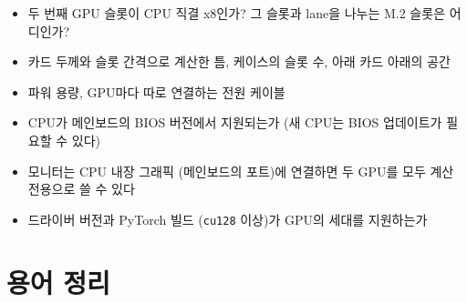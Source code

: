 \documentclass[11pt,a4paper]{article}
\begin{document}
\begin{thinkbox}[확인 목록]
\begin{itemize}[leftmargin=1.5em]
\item 두 번째 GPU 슬롯이 CPU 직결 x8인가? 그 슬롯과 lane을 나누는 M.2 슬롯은 어디인가?
\item 카드 두께와 슬롯 간격으로 계산한 틈, 케이스의 슬롯 수, 아래 카드 아래의 공간
\item 파워 용량, GPU마다 따로 연결하는 전원 케이블
\item CPU가 메인보드의 BIOS 버전에서 지원되는가 (새 CPU는 BIOS 업데이트가 필요할 수 있다)
\item 모니터는 CPU 내장 그래픽 (메인보드의 포트)에 연결하면 두 GPU를 모두 계산 전용으로 쓸 수 있다
\item 드라이버 버전과 PyTorch 빌드 (\texttt{cu128} 이상)가 GPU의 세대를 지원하는가
\end{itemize}
\end{thinkbox}

\section{용어 정리}\label{sec:glossary}
\end{document}
